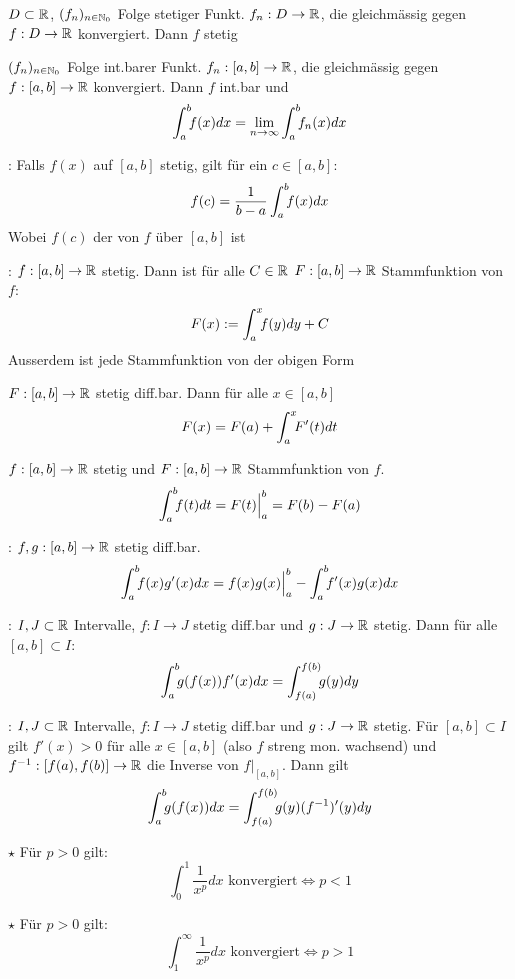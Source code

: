 \Satz $D \subset \mathbb{R}$, $(f_n)_{n \in \mathbb{N}_0}$ Folge stetiger Funkt. $f_n: D \to \mathbb{R}$, die gleichmässig
gegen $f: D \to \mathbb{R}$ konvergiert. Dann $f$ stetig

\Satz $(f_n)_{n \in \mathbb{N}_0}$ Folge int.barer Funkt. $f_n: [a, b] \to \mathbb{R}$, die gleichmässig
gegen $f: [a, b] \to \mathbb{R}$ konvergiert. Dann $f$ int.bar und
$$\displaystyle \int_a^b \hspace{-4pt}f(x)dx = \lim_{n\to\infty}\int_a^b \hspace{-4pt}f_n(x)dx$$

\Satz {}: Falls $f(x)$ auf $[a, b]$ stetig, gilt für ein
$c \in [a, b]$:
\vspace{-10pt}
$$f(c) = \frac{1}{b-a}\int_a^b \hspace{-4pt}f(x)dx$$
Wobei $f(c)$ der  von $f$ über $[a, b]$ ist

\Satz {}: $f: [a, b] \to \mathbb{R}$ stetig.
Dann ist für alle $C \in \mathbb{R}$ $F: [a, b] \to \mathbb{R}$ Stammfunktion von $f$:
$$F(x) := \int_{a}^{x} \hspace{-4pt} f(y) dy + C$$
Ausserdem ist jede Stammfunktion von der obigen Form

\Kor $F: [a, b] \to \mathbb{R}$ stetig diff.bar. Dann für alle $x \in [a, b]$
$$F(x) = F(a) + \int_{a}^{x} \hspace{-4pt}F'(t) dt$$

\Kor $f: [a, b] \to \mathbb{R}$ stetig und $F: [a, b] \to \mathbb{R}$ Stammfunktion von $f$.
$$\int_a^b \hspace{-4pt} f(t) dt = F(t)\Big|_a^b = F(b) - F(a)$$

\Satz {}: $f,g: [a, b] \to \mathbb{R}$ stetig diff.bar.
$$\int_a^b \hspace{-4pt} f(x)g'(x) dx = f(x)g(x) \Big|_a^b - \int_a^b \hspace{-4pt} f'(x)g(x) dx$$

\Satz {}: $I, J \subset \mathbb{R}$ Intervalle, $f: I \to J$ stetig diff.bar und
$g: J \to \mathbb{R}$ stetig. Dann für alle $[a, b] \subset I$:
$$\int_a^b \hspace{-4pt} g(f(x))f'(x) dx = \int_{f(a)}^{f(b)} \hspace{-4pt} g(y) dy$$

\Satz {}: $I, J \subset \mathbb{R}$ Intervalle, $f: I \to J$ stetig diff.bar
und $g: J \to \mathbb{R}$ stetig. Für $[a, b] \subset I$ gilt $f'(x) > 0$ für alle $x \in [a, b]$
(also $f$ streng mon. wachsend) und $f^{-1}: [f(a), f(b)] \to \mathbb{R}$ die Inverse von $f\Big|_{[a,b]}$. Dann gilt
$$\int_a^b \hspace{-4pt} g(f(x)) dx = \int_{f(a)}^{f(b)} \hspace{-4pt} g(y)(f^{-1})'(y)dy$$

\Satz $\star$ Für $p > 0$ gilt:
$$\int_{0}^{1} \frac{1}{x^p} dx \text{ konvergiert} \iff p < 1$$

\Satz $\star$ Für $p > 0$ gilt:
$$\int_{1}^{\infty} \frac{1}{x^p} dx \text{ konvergiert} \iff p > 1$$
